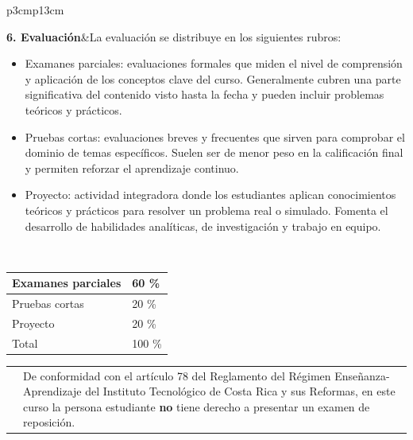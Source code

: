 \documentclass[letterpaper]{article}%
\begin{document}
\vspace*{2mm}%
\newline%
\begin{tabularx}{\textwidth}{p{3cm}p{13cm}}%
\par\fontsize{12}{14}\selectfont \textbf{\textcolor{parte}{6. Evaluación}}&La evaluación se distribuye en los siguientes rubros: \newline \begin{itemize} \item Examanes parciales: evaluaciones formales que miden el nivel de comprensión y aplicación de los conceptos clave del curso. Generalmente cubren una parte significativa del contenido visto hasta la fecha y pueden incluir problemas teóricos y prácticos. \item Pruebas cortas: evaluaciones breves y frecuentes que sirven para comprobar el dominio de temas específicos. Suelen ser de menor peso en la calificación final y permiten reforzar el aprendizaje continuo. \item Proyecto: actividad integradora donde los estudiantes aplican conocimientos teóricos y prácticos para resolver un problema real o simulado. Fomenta el desarrollo de habilidades analíticas, de investigación y trabajo en equipo. \end{itemize}\\%
\end{tabularx}%
\vspace*{2mm}%
\newline%
 \begin{minipage}{\linewidth}  \centering  \begin{tabular}{ p{4cm}  p{1.5cm} }  \toprule  Examanes parciales & 60 \% \\  \midrule  Pruebas cortas & 20 \% \\  \midrule  Proyecto & 20 \% \\  \midrule Total & 100 \% \\  \bottomrule  \end{tabular} \end{minipage}%
\vspace*{2mm}%
\newline%
\begin{tabularx}{\textwidth}{p{3cm}p{13cm}}%
&De conformidad con el artículo 78 del Reglamento del Régimen Enseñanza-Aprendizaje del Instituto Tecnológico de Costa Rica y sus Reformas, en este curso la persona estudiante \textbf{no} tiene derecho a presentar un examen de reposición.\\%
\end{tabularx}%
\end{document}
